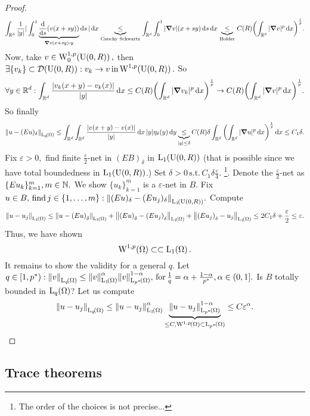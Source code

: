\documentclass{article}
\begin{document}
\begin{proof}
	\[
		\int_{\R^d}\frac{1}{|y|}|\int_{0}^1 \underbrace{\dv{s} \qty(v(x+sy))}_{\grad v\qty(x+sy) \vdot y}\dd{s}|\dd{x} \underbrace{\leq}_{\, \text{Cauchy Schwartz} \,} \int_{\R^d}\int_{0}^1 |\grad v| (x+sy)\dd{s}\dd{x} \underbrace{\leq}_{\, \text{Holder} \,} C(R)\qty(\int_{\R^d}|\grad v|^p \dd{x})^{\frac{1}{p}}.
	\]
	Now, take $v \in \WkpzeroSet[1][p]{\text{U}(0,R)}, $ then $\exists \{v_k\} \subset \mathcal{D}\qty(\text{U}(0,R)): v_k \to v \, \text{in} \, \WkpSet[1][p]{\text{U}(0,R)}.$ So
	\[
		\forall y \in {\mathbb R}^d: \int_{{\mathbb R}^d}\frac{|v_k(x+y)-v_k(x)|}{|y|}\dd{x}\leq C(R) \qty(\int_{{\mathbb R}^d}|\grad v_k|^p\dd{x})^{\frac{1}{p}} \to C(R)\qty(\int_{{\mathbb R}^d}|\grad v|^p\dd{x})^{\frac{1}{p}}.
	\]
	So finally
	\[
		\norm{u-(Eu)_{\delta}}_{\LpSet[q]{\Omega}} \leq \int_{\R^d}\int_{\R^d}\frac{|v(x+y)-v(x)|}{|y|}\dd{x} |y| \eta_{\delta}(y)\dd{y} \underbrace{\leq}_{|y|\leq \delta} C(R) \delta \int_{\R^d}\qty(\int_{\R^d}|\grad u|^p \dd{x})^{\frac{1}{p}}\dd{x} \leq C_1 \delta.
	\]
	Fix $\varepsilon >0, $ find finite $\frac{\varepsilon}{2}$-net in $(EB)_{\delta}$ in $\LpSet[1]{\text{U}(0,R)}$ (that is possible since we have total boundedness in $\LpSet[1]{\text{U}(0,R)}$.) Set $\delta >0 \, \text{s.t.} \, C_1 \delta \frac{\varepsilon}{4}.$ \footnote{The order of the choices is not precise...}. Denote the $\frac{\varepsilon}{2}$-net as $\{Eu_k\}_{k=1}^{m}, m \in {\mathbb N}.$ We show $\{u_k\}_{k=1}^{m}$ is a $\varepsilon$-net in $B$. Fix $u \in B, \, \text{find} \, j \in \{1,\dots,m\}: \norm{(Eu)_{\delta}-(Eu_j)_{\delta}}_{\LpSet[1]{\text{U}(0,R)}}.$ Compute
	\[
		\norm{u-u_j}_{\LpSet[1]{\Omega}} \leq \norm{u-\qty(Eu)_{\delta}}_{\LpSet[1]{\Omega}} + \norm{\qty(Eu)_{\delta}-\qty(Eu_j)_{\delta}}_{\LpSet[1]{\Omega}}+ \norm{\qty(Eu_j)_{\delta}-u_j}_{\LpSet[1]{\Omega}}\leq 2C_1 \delta + \frac{\varepsilon}{2} \leq \varepsilon.
	\]
	Thus, we have shown
	\[
		\WkpSet[1][p]{\Omega} \subset \subset \LpSet[1]{\Omega}.
	\]
	It remains to show the validity for a general $q$. Let $q \in [1,p^{*}): \norm{v}_{\LpSet[q]{\Omega}} \leq \norm{v}_{\LpSet[1]{\Omega}}^\alpha \norm{v}_{\LpSet[p^{*}]{\Omega}}^{1-\alpha}, \, \text{for} \, \frac{1}{q}=\alpha + \frac{1-\alpha}{p^{*}}, \alpha \in (0,1].$ Is $B$ totally bounded in $\LpSet[q]{\Omega}$? Let us compute
	\[
		\norm{u-u_j}_{\LpSet[q]{\Omega}}\leq \norm{u-u_j}_{\LpSet[1]{\Omega}}^\alpha \underbrace{\norm{u-u_j}_{\LpSet[p^{*}]{\Omega}}^{1-\alpha}}_{\leq C, \WkpSet[1][p]{\Omega}\subset \LpSet[p^{*}]{\Omega}}\leq C \varepsilon^\alpha.
	\]
\end{proof}

\subsection{Trace theorems}
\label{sec:traces}
\end{document}
